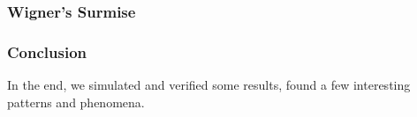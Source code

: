 \begin{frame} \frametitle{Wigner's Surmise}
\end{frame}
\begin{frame} \frametitle{Conclusion}
  In the end, we simulated and verified some results, found a few interesting patterns and phenomena.
\end{frame}


